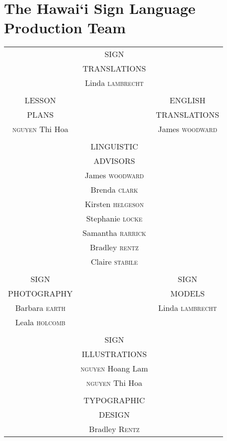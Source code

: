 \documentclass{tufte-book}
\begin{document}
\chapter*{The Hawai`i Sign Language \\Production Team}
\thispagestyle{empty}
\begin{fullwidth}
\begin{table*}[h!]
\begin{center}
\begin{tabular}{c c c}
&SIGN&\\
&TRANSLATIONS&\\
&Linda \textsc{lambrecht} &\\
& & \\
LESSON & & ENGLISH\\
PLANS & & TRANSLATIONS\\
\textsc{nguyen} Thi Hoa & & James \textsc{woodward}\\
& & \\
& LINGUISTIC &\\
& ADVISORS & \\
& James \textsc{woodward} &\\
&Brenda \textsc{clark}&\\
&Kirsten \textsc{helgeson}&\\
&Stephanie \textsc{locke}&\\
& Samantha \textsc{rarrick} &\\
& Bradley \textsc{rentz}& \\
& Claire \textsc{stabile}&\\
&&\\
SIGN & &SIGN\\
PHOTOGRAPHY&&MODELS\\
Barbara \textsc{earth} & & Linda \textsc{lambrecht}\\
Leala \textsc{holcomb}  & &\\
&&\\
&SIGN&\\
&ILLUSTRATIONS&\\
& \textsc{nguyen} Hoang Lam&\\
& \textsc{nguyen} Thi Hoa &\\
&&\\
&TYPOGRAPHIC&\\
&DESIGN&\\
&Bradley \textsc{Rentz}\\


\end{tabular}
\end{center}
\end{table*}









\end{fullwidth}
\end{document}
